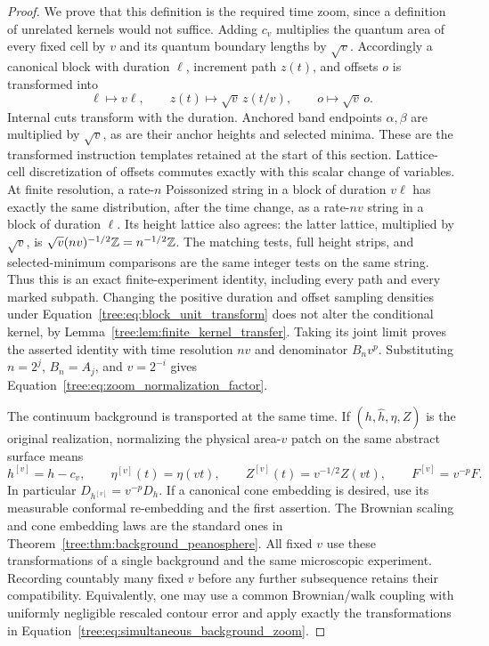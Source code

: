 \begin{proof}
We prove that this definition is the required time zoom, since a
definition of unrelated kernels would not suffice.  Adding $c_v$
multiplies the quantum area of every fixed cell by $v$ and its
quantum boundary lengths by $\sqrt v$.  Accordingly a canonical
block with duration $\ell$, increment path $z(t)$, and offsets $o$
is transformed into
\begin{equation}\label{tree:eq:block_unit_transform}
 \ell\mapsto v\ell,\qquad
 z(t)\mapsto\sqrt v\,z(t/v),\qquad
 o\mapsto\sqrt v\,o.
\end{equation}
Internal cuts transform with the duration. Anchored band endpoints
$\alpha,\beta$ are multiplied by $\sqrt v$, as are their anchor
heights and selected minima. These are the transformed instruction
templates retained at the start of this section. Lattice-cell
discretization of offsets commutes exactly with this scalar change
of variables. At finite resolution,
a rate-$n$ Poissonized string in a block of duration $v\ell$ has
exactly the same distribution, after the time change, as a
rate-$nv$ string in a block of duration $\ell$.  Its height lattice
also agrees: the latter lattice, multiplied by $\sqrt v$, is
$\sqrt v(nv)^{-1/2}\mathbb Z=n^{-1/2}\mathbb Z$.  The matching tests, full height
strips, and selected-minimum comparisons are the same integer
tests on the same string.  Thus this is an exact finite-experiment
identity, including every path and every marked subpath.  Changing
the positive duration and offset sampling densities under
Equation~\eqref{tree:eq:block_unit_transform} does not alter the
conditional kernel, by Lemma~\ref{tree:lem:finite_kernel_transfer}.
Taking its joint limit proves the asserted identity with time
resolution $nv$ and denominator $B_nv^p$.  Substituting
$n=2^j$, $B_n=A_j$, and $v=2^{-i}$ gives
Equation~\eqref{tree:eq:zoom_normalization_factor}.

The continuum background is transported at the same time.  If
$(h,\widehat h,\eta,Z)$ is the original realization, normalizing
the physical area-$v$ patch on the same abstract surface means
\begin{equation}\label{tree:eq:simultaneous_background_zoom}
 h^{[v]}=h-c_v,\qquad
 \eta^{[v]}(t)=\eta(vt),\qquad
 Z^{[v]}(t)=v^{-1/2}Z(vt),\qquad
 F^{[v]}=v^{-p}F.
\end{equation}
In particular $D_{h^{[v]}}=v^{-p}D_h$.  If a canonical cone
embedding is desired, use its measurable conformal re-embedding
and the first assertion.  The Brownian scaling and cone embedding
laws are the standard ones in Theorem~\ref{tree:thm:background_peanosphere}.
All fixed $v$ use these transformations of a single background and
the same microscopic experiment.  Recording countably many fixed
$v$ before any further subsequence retains their compatibility.
Equivalently, one may use a common Brownian/walk coupling with
uniformly negligible rescaled contour error and apply exactly
the transformations in Equation~\eqref{tree:eq:simultaneous_background_zoom}.


\end{proof}
